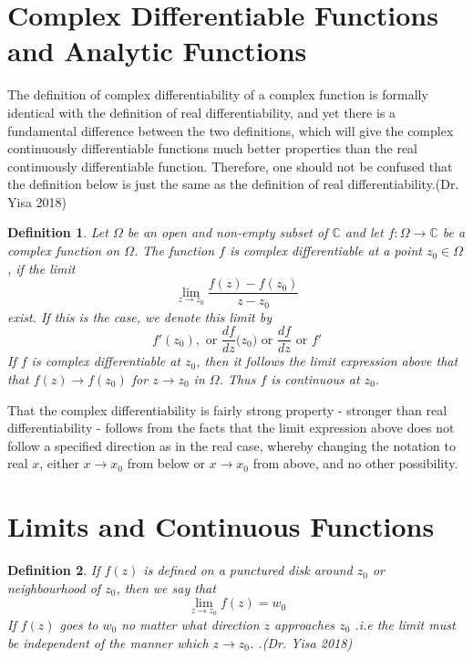\documentclass[11pt]{report}
\newcommand{\sprime}{'}
\newcommand{\NI}{\noindent}
\newcommand{\complex}{\mathbb{C}}
\newtheorem{definition}{Definition}[chapter]
\begin{document}
	\section{Complex Differentiable Functions and Analytic Functions}
	The definition of complex differentiability of a complex function is formally identical with the definition of real differentiability, and yet there is a fundamental difference between the two definitions, which will give the complex continuously differentiable functions much better properties than the real continuously differentiable function. Therefore, one should not be confused that the definition below is just the same as the definition of real differentiability.(Dr. Yisa 2018)
	
	\begin{definition}
		Let $\Omega$ be an open and non-empty subset of $\complex$ and let $f:\Omega\rightarrow\complex$ be a complex function on $\Omega$. The function $f$ is complex differentiable at a point $z_0\in\Omega$, if the limit
		\begin{equation}
			\lim\limits_{z\rightarrow z_0}\frac{f(z)-f(z_0)}{z-z_0}\label{eq:2_1}
		\end{equation} 
		exist. If this is the case, we denote this limit by 
		\begin{equation}
			f\sprime(z_0), \text{ or } \frac{df}{dz}\big(z_0\big) \text{ or } \frac{df}{dz} \text{ or } f\sprime \label{eq:2_2}
		\end{equation}
		If $f$ is complex differentiable at $z_0$, then it follows the limit expression above that that $f(z)\rightarrow f(z_0)$ for $z\rightarrow z_0$ in $\Omega$. Thus $f$ is continuous at $z_0$.
	\end{definition}
	\NI That the complex differentiability is fairly strong property - stronger than real differentiability - follows from the facts that the limit expression above does not follow a specified direction as in the real case, whereby changing the notation to real $x$, either $x\rightarrow x_0$ from below or $x\rightarrow x_0$ from above, and no other possibility.
	
	\section{Limits and Continuous Functions}
	\begin{definition}
		If $f(z)$ is defined on a punctured disk around $z_0$ or neighbourhood of $z_0$, then we say that
		\begin{equation}
			\lim\limits_{z\rightarrow z_0} f(z) = w_0\label{eq:2_3}
		\end{equation}
		If $f(z)$ goes to $w_0$ no matter what direction $z$ approaches $z_0$ .i.e the limit must be independent of the manner which $z\rightarrow z_0$. .(Dr. Yisa 2018)\\
	\end{definition}
\end{document}
